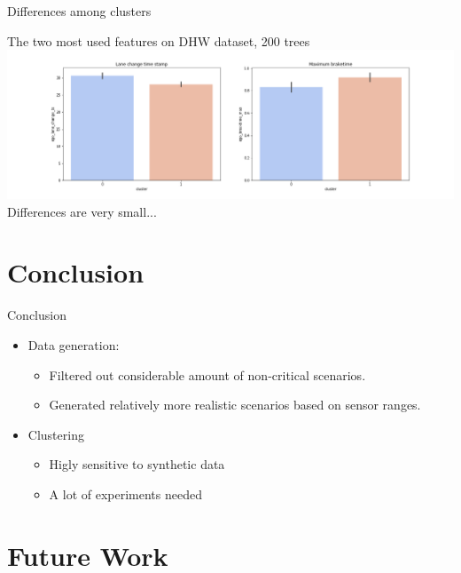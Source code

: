 \documentclass[shortpres]{beamer}
\begin{document}
\begin{frame}{Differences among clusters}

The two most used features on DHW dataset, 200 trees
{
\centering
\includegraphics[width=\textwidth]{bar.png}
}
Differences are very small...

\end{frame}


\section{Conclusion}

\begin{frame}{Conclusion}

\begin{itemize} 
\item Data generation:
	\begin{itemize}
	\item Filtered out considerable amount of non-critical scenarios.
	\item Generated relatively more realistic scenarios based on sensor ranges.
	\end{itemize}
\item Clustering
\begin{itemize}
\item Higly sensitive to synthetic data
\item A lot of experiments needed
\end{itemize}
\end{itemize}

\end{frame}

\section{Future Work}
\end{document}
